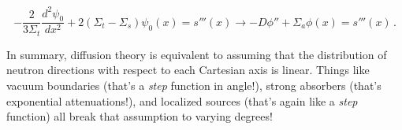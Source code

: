 \documentclass[compact]{ne630handout}
\begin{document}
\begin{handoutflow}
\begin{equation*}
-\frac{2}{3\Sigma_t}\frac{d^2\psi_0}{dx^2} + 2(\Sigma_t-\Sigma_s)\psi_0(x) = s'''(x)
  \longrightarrow \boxed{-D\phi'' + \Sigma_a \phi(x) = s'''(x)} \, .
  \tag{6}
\end{equation*}

In summary, diffusion theory is equivalent to assuming that the distribution of neutron directions with respect to each Cartesian axis is linear.   Things like vacuum boundaries (that's a \emph{step} function in angle!), strong absorbers (that's exponential attenuations!), and localized sources (that's again like a \emph{step} function) all break that assumption to varying degrees!



\end{handoutflow}
\end{document}
